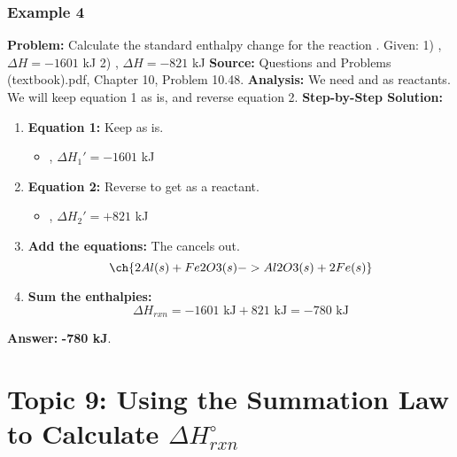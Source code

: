 \documentclass{article}
\begin{document}
\subsubsection{Example 4}
\textbf{Problem:} Calculate the standard enthalpy change for the reaction .
Given:
1) , $\Delta H = -1601$ kJ
2) , $\Delta H = -821$ kJ
\textbf{Source:} Questions and Problems (textbook).pdf, Chapter 10, Problem 10.48.
\textbf{Analysis:} We need  and  as reactants. We will keep equation 1 as is, and reverse equation 2.
\textbf{Step-by-Step Solution:}
\begin{enumerate}
    \item \textbf{Equation 1:} Keep as is.
    \begin{itemize}
        \item {}, $\Delta H_1' = -1601$ kJ
    \end{itemize}
    \item \textbf{Equation 2:} Reverse to get  as a reactant.
    \begin{itemize}
        \item {}, $\Delta H_2' = +821$ kJ
    \end{itemize}
    \item \textbf{Add the equations:} The  cancels out.
    \[ \ch{2Al(s) + Fe2O3(s) -> Al2O3(s) + 2Fe(s)} \]
    \item \textbf{Sum the enthalpies:}
    \[ \Delta H_{rxn} = -1601 \text{ kJ} + 821 \text{ kJ} = -780 \text{ kJ} \]
\end{enumerate}
\textbf{Answer:} \textbf{-780 kJ}.

\section{Topic 9: Using the Summation Law to Calculate $\Delta H_{rxn}^\circ$}
\end{document}
